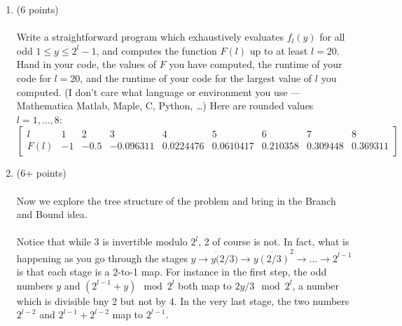 \documentclass{article}
\begin{document}
\begin{enumerate}[label= (\alph*)]
      \item (6 points) \paragraph{} Write a straightforward program which exhaustively
            evaluates \(f_l (y)\) for all odd \(1 \leq y \leq 2^l - 1\), and computes the
            function \(F(l)\) up to at least \(l =20\). Hand in your code, the values of \(F\)
            you have computed, the runtime of your code for \(l = 20\), and the runtime of your
            code for the largest value of \(l\) you computed. (I don't care what language or
            environment you use --- Mathematica Matlab, Maple, C, Python, \ldots)
            Here are rounded values \(l = 1, \ldots, 8\):
            \[
                  \left[
                        \begin{array}{c|c|c|c|c|c|c|c|c}
                              l    & 1  & 2    & 3         & 4         & 5         & 6        & 7        & 8        \\
                              \hline
                              F(l) & -1 & -0.5 & -0.096311 & 0.0224476 & 0.0610417 & 0.210358 & 0.309448 & 0.369311
                        \end{array}
                        \right]
            \]
      \item (6+ points) \paragraph{}
            Now we explore the tree structure of the problem and
            bring in the Branch and Bound idea.
            \paragraph{}
            Notice that while 3 is invertible modulo \(2^l\), 2 of course is not.
            In fact, what is happening as you go through the stages
            \( y \rightarrow y \dot ( 2 / 3 ) \rightarrow y \dot {( 2/3 )}^2 \rightarrow \ldots
            \rightarrow 2^{l-1}\) is that each stage is a 2-to-1 map. For instance in the first
            step, the odd numbers \(y\) and \((2^{l-1} + y) \mod 2^l \) both map to \(2y/3 \mod
            2^l\), a number which is divisible bny 2 but not by 4. In the very last stage, the two
            numbers \(2^{l-2}\) and \(2^{l-1} + 2^{l-2}\) map to \(2^{l-1}\).

\end{enumerate}
\end{document}
